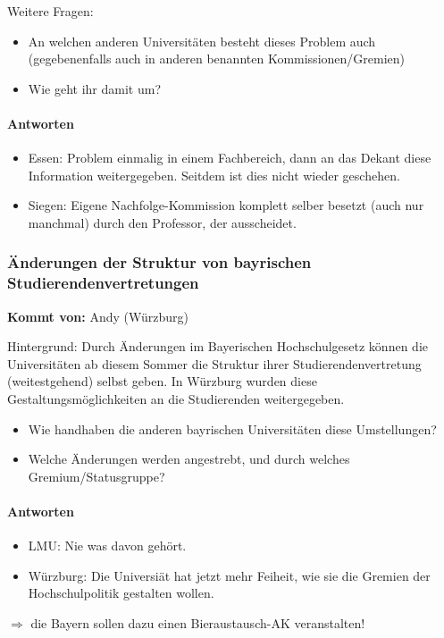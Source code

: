       Weitere Fragen: \\
      \begin{itemize}
        \item An welchen anderen Universitäten besteht dieses Problem auch (gegebenenfalls auch in anderen benannten Kommissionen/Gremien)
        \item Wie geht ihr damit um?
      \end{itemize}

      \paragraph{Antworten}
        \begin{itemize}
          \item Essen: Problem einmalig in einem Fachbereich, dann an das Dekant diese Information weitergegeben. Seitdem ist dies nicht wieder geschehen.
          \item Siegen: Eigene Nachfolge-Kommission komplett selber besetzt (auch nur manchmal) durch den Professor, der ausscheidet.
        \end{itemize}

    \subsubsection*{Änderungen der Struktur von bayrischen Studierendenvertretungen}
      \textbf{Kommt von:} Andy (Würzburg)

      Hintergrund: Durch Änderungen im Bayerischen Hochschulgesetz können die Universitäten ab diesem Sommer die Struktur ihrer Studierendenvertretung (weitestgehend) selbst geben. In Würzburg wurden diese Gestaltungsmöglichkeiten an die Studierenden weitergegeben.
      \begin{itemize}
        \item Wie handhaben die anderen bayrischen Universitäten diese Umstellungen?
        \item Welche Änderungen werden angestrebt, und durch welches Gremium/Statusgruppe?
      \end{itemize}

      \paragraph{Antworten}
        \begin{itemize}
          \item LMU: Nie was davon gehört.
          \item Würzburg: Die Universiät hat jetzt mehr Feiheit, wie sie die Gremien der Hochschulpolitik gestalten wollen.
        \end{itemize}
        $\Rightarrow$ die Bayern sollen dazu einen Bieraustausch-AK veranstalten!

